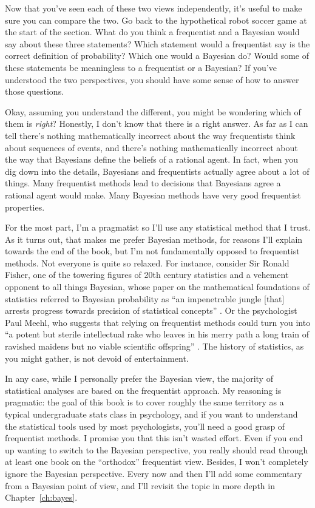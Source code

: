 
Now that you've seen each of these two views independently, it's useful to make sure you can compare the two. Go back to the hypothetical robot soccer game at the start of the section. What do you think a frequentist and a Bayesian would say about these three statements? Which statement would a frequentist say is the correct definition of probability? Which one would a Bayesian do? Would some of these statements be meaningless to a frequentist or a Bayesian? If you've understood the two perspectives, you should have some sense of how to answer those questions.

Okay, assuming you understand the different, you might be wondering which of them is {\it right}? Honestly, I don't know that there is a right answer. As far as I can tell there's nothing mathematically incorrect about the way frequentists think about sequences of events, and there's nothing mathematically incorrect about the way that Bayesians define the beliefs of a rational agent. In fact, when you dig down into the details, Bayesians and frequentists actually agree about a lot of things. Many frequentist methods lead to decisions that Bayesians agree a rational agent would make. Many Bayesian methods have very good frequentist properties. 

For the most part, I'm a pragmatist so I'll use any statistical method that I trust. As it turns out, that makes me prefer Bayesian methods, for reasons I'll explain towards the end of the book, but I'm not fundamentally opposed to frequentist methods. Not everyone is quite so relaxed. For instance, consider Sir Ronald Fisher, one of the towering figures of 20th century statistics and a vehement opponent to all things Bayesian, whose paper on the mathematical foundations of statistics referred to Bayesian probability as ``an impenetrable jungle [that] arrests progress towards precision of statistical concepts'' \cite[p. 311]{Fisher1922b}. Or the psychologist Paul Meehl, who suggests that relying on frequentist methods could turn you into ``a potent but sterile intellectual rake who leaves in his merry path a long train of ravished maidens but no viable scientific offspring'' \cite[p. 114]{Meehl1967}. The history of statistics, as you might gather, is not devoid of entertainment.

In any case, while I personally prefer the Bayesian view, the majority of statistical analyses are based on the frequentist approach. My reasoning is pragmatic: the goal of this book is to cover roughly the same territory as a typical undergraduate stats class in psychology, and if you want to understand the statistical tools used by most psychologists, you'll need a good grasp of frequentist methods. I promise you that this isn't wasted effort. Even if you end up wanting to switch to the Bayesian perspective, you really should read through at least one book on the ``orthodox'' frequentist view. Besides, I won't completely ignore the Bayesian perspective. Every now and then I'll add some commentary from a Bayesian point of view, and I'll revisit the topic in more depth in Chapter~\ref{ch:bayes}.


